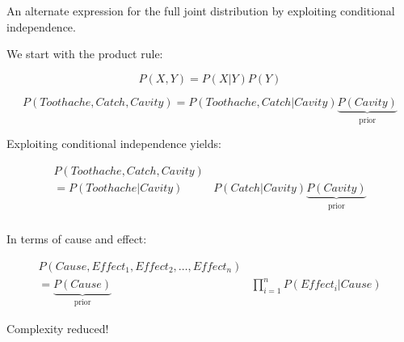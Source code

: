 \begin{frame}\frametitle{\subsecname}

An alternate expression for the full joint distribution by exploiting conditional independence.

We start with the product rule:

\begin{equation}
P(X,Y) = P(X|Y)P(Y)    
\end{equation}

\begin{equation}
P(Toothache,Catch,Cavity) = P(Toothache,Catch|Cavity) \underbrace{P(Cavity)}_{\text{prior}} 
\end{equation}

Exploiting conditional independence yields:

\begin{align}
P(Toothache,Catch,Cavity) &\\
= P(Toothache|Cavity) &P(Catch|Cavity) \underbrace{P(Cavity)}_{\text{prior}} 
\end{align}

\end{frame}

\begin{frame}\frametitle{\subsecname}


In terms of cause and effect:

\begin{align}
P(Cause,Effect_1,Effect_2,\ldots,Effect_n) &\\
= \underbrace{P(Cause)}_{\text{prior}} &\prod_{i=1}^{n} P(Effect_{i}|Cause)
\end{align}

Complexity reduced!

\end{frame}

